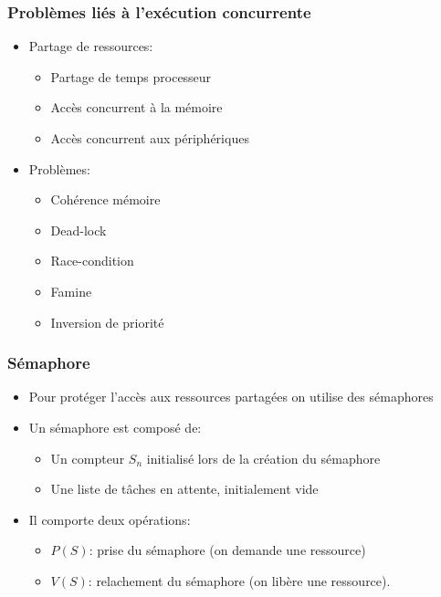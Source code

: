 \documentclass[ignorenonframetext,]{beamer}
\begin{document}
\begin{frame}\frametitle{Problèmes liés à l'exécution concurrente}

\begin{itemize}
\item
  Partage de ressources:

  \begin{itemize}
  \item
    Partage de temps processeur
  \item
    Accès concurrent à la mémoire
  \item
    Accès concurrent aux périphériques
  \end{itemize}
\item
  Problèmes:

  \begin{itemize}
  \item
    Cohérence mémoire
  \item
    Dead-lock
  \item
    Race-condition
  \item
    Famine
  \item
    Inversion de priorité
  \end{itemize}
\end{itemize}

\end{frame}

\begin{frame}\frametitle{Sémaphore}

\begin{itemize}
\item
  Pour protéger l'accès aux ressources partagées on utilise des
  sémaphores
\item
  Un sémaphore est composé de:

  \begin{itemize}
  \item
    Un compteur $S_n$ initialisé lors de la création du sémaphore
  \item
    Une liste de tâches en attente, initialement vide
  \end{itemize}
\item
  Il comporte deux opérations:

  \begin{itemize}
  \item
    $P(S)$: prise du sémaphore (on demande une ressource)
  \item
    $V(S)$: relachement du sémaphore (on libère une ressource).
  \end{itemize}
\end{itemize}

\end{frame}
\end{document}
